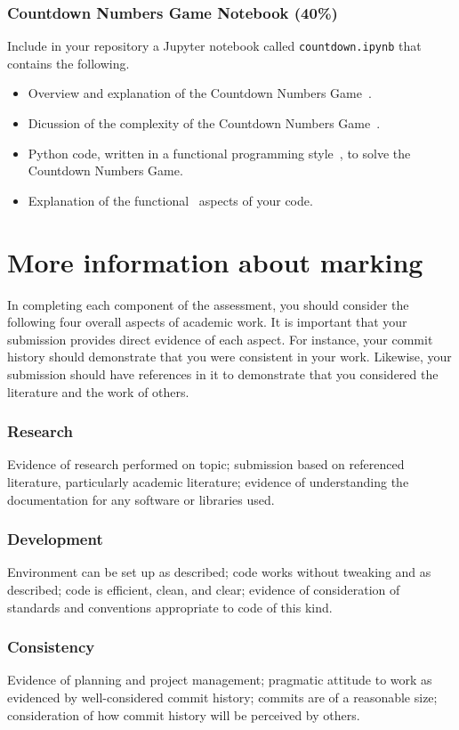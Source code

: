 \documentclass[a4paper, 12pt]{scrartcl}
\begin{document}
  \subsubsection*{Countdown Numbers Game Notebook (40\%)}
  Include in your repository a Jupyter notebook called \texttt{countdown.ipynb} that contains the following.
  \begin{itemize}
    \item Overview and explanation of the Countdown Numbers Game~\cite{countdownnumbers}.
    \item Dicussion of the complexity of the Countdown Numbers Game~\cite{countdownnumbers}.
    \item Python code, written in a functional programming style~\cite{pythonfunctional}, to solve the Countdown Numbers Game.
    \item Explanation of the functional~\cite{pythonfunctional} aspects of your code.
  \end{itemize}

  \section*{More information about marking}
    In completing each component of the assessment, you should consider the following four overall aspects of academic work.
    It is important that your submission provides direct evidence of each aspect.
    For instance, your commit history should demonstrate that you were consistent in your work.
    Likewise, your submission should have references in it to demonstrate that you considered the literature and the work of others.
  
    \subsubsection*{Research}
    Evidence of research performed on topic; submission based on referenced literature, particularly academic literature; evidence of understanding the documentation for any software or libraries used.
    \subsubsection*{Development}
    Environment can be set up as described; code works without tweaking and as described; code is efficient, clean, and clear; evidence of consideration of standards and conventions appropriate to code of this kind.
    \subsubsection*{Consistency}
    Evidence of planning and project management; pragmatic attitude to work as evidenced by well-considered commit history; commits are of a reasonable size; consideration of how commit history will be perceived by others.
\end{document}
